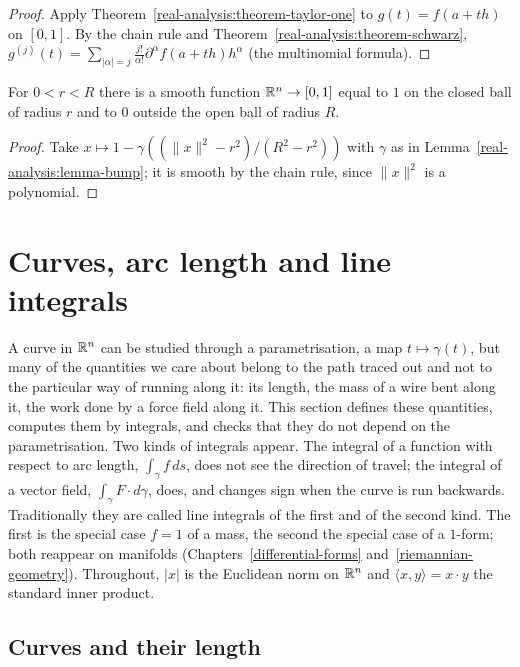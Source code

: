 \begin{proof}
Apply Theorem~\ref{real-analysis:theorem-taylor-one} to $g(t) = f(a + th)$ on $[0, 1]$. By the chain rule and Theorem~\ref{real-analysis:theorem-schwarz},
$g^{(j)}(t) = \sum_{|\alpha| = j}\frac{j!}{\alpha!}\partial^\alpha f(a + th)h^\alpha$ (the multinomial formula).
\end{proof}

\begin{corollary}\label{real-analysis:corollary-bump-function}
For $0 < r < R$ there is a smooth function $\mathbb{R}^n \to [0, 1]$ equal to $1$ on the closed ball of radius $r$ and to $0$ outside the open ball of radius $R$.
\end{corollary}

\begin{proof}
Take $x \mapsto 1 - \gamma((\|x\|^2 - r^2)/(R^2 - r^2))$ with $\gamma$ as in Lemma~\ref{real-analysis:lemma-bump}; it is smooth by the chain rule, since $\|x\|^2$ is a polynomial.
\end{proof}

\section{Curves, arc length and line integrals}\label{real-analysis:section-curves}

A curve in $\mathbb{R}^n$ can be studied through a parametrisation, a map $t \mapsto \gamma(t)$, but many of the quantities we care about belong to the path traced out and not to the particular way of running
along it: its length, the mass of a wire bent along it, the work done by a force field along it. This section defines these quantities, computes them by integrals, and checks that they do not
depend on the parametrisation. Two kinds of integrals appear. The integral of a function with respect to arc length, $\int_\gamma f\,ds$, does not see the direction of travel; the integral of a vector
field, $\int_\gamma F \cdot d\gamma$, does, and changes sign when the curve is run backwards. Traditionally they are called line integrals of the first and of the second kind. The first is the special case
$f = 1$ of a mass, the second the special case of a $1$-form; both reappear on manifolds (Chapters~\ref{differential-forms} and~\ref{riemannian-geometry}). Throughout, $|x|$ is the Euclidean norm on $\mathbb{R}^n$ and
$\langle x, y\rangle = x \cdot y$ the standard inner product.

\subsection{Curves and their length}\label{real-analysis:subsection-curve-length}

